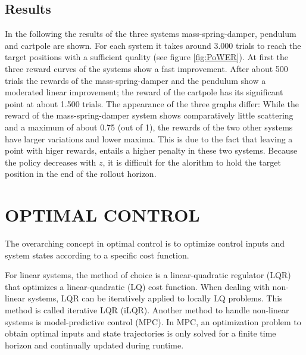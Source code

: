 \documentclass[letterpaper, 10 pt, conference]{ieeeconf}  %
\begin{document}

%

\subsection{Results}
In the following the results of the three systems mass-spring-damper, pendulum and cartpole are shown. For each system it takes around 3.000 trials to reach the target positions with a sufficient quality (see figure \ref{fig:PoWER}). At first the three reward curves of the systems show a fast improvement. After about 500 trials the rewards of the mass-spring-damper and the pendulum show a moderated linear improvement; the reward of the cartpole has its significant point at about 1.500 trials. The appearance of the three graphs differ: While the reward of the mass-spring-damper system shows comparatively little scattering and a maximum of about 0.75 (out of 1), the rewards of the two other systems have larger variations and lower maxima. This is due to the fact that leaving a point with higer rewards, entails a higher penalty in these two systems. Because the policy decreases with $z$, it is difficult for the alorithm to hold the target position in the end of the rollout horizon.


\section{OPTIMAL CONTROL}
The overarching concept in optimal control is to optimize control inputs and system states according to a specific cost function. 

For linear systems, the method of choice is a linear-quadratic regulator (LQR) that optimizes a linear-quadratic (LQ) cost function. When dealing with non-linear systems, LQR can be iteratively applied to locally LQ problems. This method is called iterative LQR (iLQR). Another method to handle non-linear systems is model-predictive control (MPC). In MPC, an optimization problem to obtain optimal inputs and state trajectories is only solved for a finite time horizon and continually updated during runtime.
\end{document}
